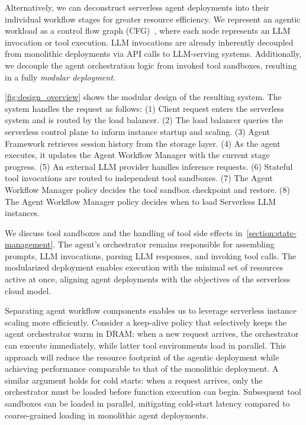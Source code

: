 Alternatively, we can deconstruct serverless agent deployments into their individual workflow stages for greater resource efficiency.
We represent an agentic workload as a control flow graph (CFG)~\cite{lin2024parrotefficientservingllmbased, luo2025autellixefficientservingengine, wadlom2026efficientllmservingagentic}, where each node represents an LLM invocation or tool execution.
LLM invocations are already inherently decoupled from monolithic deployments via API calls to LLM-serving systems.
Additionally, we decouple the agent orchestration logic from invoked tool sandboxes, resulting in a fully \textit{modular deployment}. 

\autoref{fig:design_overview} shows the modular design of the resulting system. The system handles the request as follows:
(1) Client request enters the serverless system and is routed by the load balancer.
(2) The load balancer queries the serverless control plane to inform instance startup and scaling.
(3) Agent Framework retrieves session history from the storage layer. 
(4) As the agent executes, it updates the Agent Workflow Manager with the current stage progress.
(5) An external LLM provider handles inference requests.
(6) Stateful tool invocations are routed to independent tool sandboxes.
(7) The Agent Workflow Manager policy decides the tool sandbox checkpoint and restore.
(8) The Agent Workflow Manager policy decides when to load Serverless LLM instances.

We discuss tool sandboxes and the handling of tool side effects in~\ref{section:state-management}.
The agent's orchestrator remains responsible for assembling prompts, LLM invocations, parsing LLM responses, and invoking tool calls.
The modularized deployment enables execution with the minimal set of resources active at once, aligning agent deployments with the objectives of the serverless cloud model.

Separating agent workflow components enables us to leverage serverless instance scaling more efficiently.
Consider a keep-alive policy that selectively keeps the agent orchestrator warm in DRAM: when a new request arrives, the orchestrator can execute immediately, while latter tool environments load in parallel.
This approach will reduce the resource footprint of the agentic deployment while achieving performance comparable to that of the monolithic deployment.
A similar argument holds for cold starts: when a request arrives, only the orchestrator must be loaded before function execution can begin.
Subsequent tool sandboxes can be loaded in parallel, mitigating cold-start latency compared to coarse-grained loading in monolithic agent deployments.

